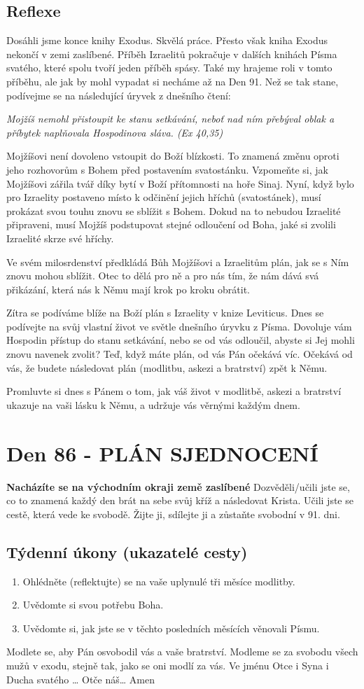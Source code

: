 \documentclass[11pt]{article}
\newcommand{\zacatekTrinactyTyden}{
\textbf{Nacházíte se na východním okraji země zaslíbené} \newline 
Dozvěděli/učili jste se, co to znamená každý den brát na sebe svůj kříž a následovat Krista. Učili jste se cestě, která vede ke svobodě. Žijte ji, sdílejte ji a zůstaňte svobodní v 91. dni.

\subsection*{Týdenní úkony (ukazatelé cesty)}
\begin{enumerate}
  \item Ohlédněte (reflektujte) se na vaše uplynulé tři měsíce modlitby.
  \item Uvědomte si svou potřebu Boha.
  \item Uvědomte si, jak jste se v těchto posledních měsících věnovali Písmu.
\end{enumerate}
Modlete se, aby Pán osvobodil vás a vaše bratrství. \newline
Modleme se za svobodu všech mužů v exodu, stejně tak, jako se oni modlí za vás.\newline
Ve jménu Otce i Syna i Ducha svatého …  Otče náš… Amen
}
\begin{document}
\subsection*{Reflexe}
Dosáhli jsme konce knihy Exodus. Skvělá práce. Přesto však kniha Exodus nekončí v zemi zaslíbené. Příběh
Izraelitů pokračuje v dalších knihách Písma svatého, které spolu tvoří jeden příběh spásy. Také my hrajeme
roli v tomto příběhu, ale jak by mohl vypadat si necháme až na Den 91. Než se tak stane, podívejme se na
následující úryvek z dnešního čtení:

\textit{Mojžíš nemohl přistoupit ke stanu setkávání, neboť nad ním přebýval oblak a příbytek naplňovala
Hospodinova sláva. (Ex 40,35)}

Mojžíšovi není dovoleno vstoupit do Boží blízkosti. To znamená změnu oproti jeho rozhovorům s Bohem
před postavením svatostánku. Vzpomeňte si, jak Mojžíšovi zářila tvář díky bytí v Boží přítomnosti na hoře
Sinaj. Nyní, když bylo pro Izraelity postaveno místo k odčinění jejich hříchů (svatostánek), musí prokázat
svou touhu znovu se sblížit s Bohem. Dokud na to nebudou Izraelité připraveni, musí Mojžíš podstupovat
stejné odloučení od Boha, jaké si zvolili Izraelité skrze své hříchy.

Ve svém milosrdenství předkládá Bůh Mojžíšovi a Izraelitům plán, jak se s Ním znovu mohou sblížit. Otec
to dělá pro ně a pro nás tím, že nám dává svá přikázání, která nás k Němu mají krok po kroku obrátit.

Zítra se podíváme blíže na Boží plán s Izraelity v knize Leviticus. Dnes se podívejte na svůj vlastní život ve
světle dnešního úryvku z Písma. Dovoluje vám Hospodin přístup do stanu setkávání, nebo se od vás odloučil,
abyste si Jej mohli znovu navenek zvolit? Teď, když máte plán, od vás Pán očekává víc. Očekává od vás, že
budete následovat plán (modlitbu, askezi a bratrství) zpět k Němu.

Promluvte si dnes s Pánem o tom, jak váš život v modlitbě, askezi a bratrství ukazuje na vaši lásku k Němu, a
udržuje vás věrnými každým dnem.


\newpage
\section{Den 86 - PLÁN SJEDNOCENÍ}
\zacatekTrinactyTyden
\end{document}
